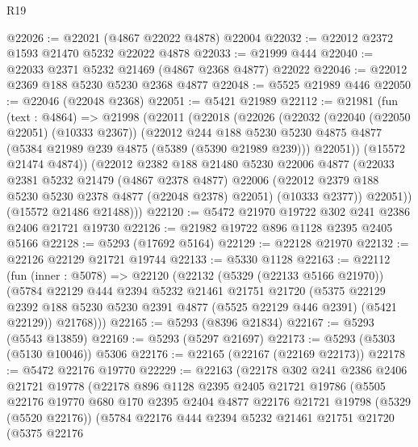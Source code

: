 \begin{lexlean}{R19}
\begin{coremodule}
@22026 := @22021 (@4867 @22022 @4878) @22004
@22032 := @22012 @2372 @1593 @21470 @5232 @22022 @4878
@22033 := @21999 @444
@22040 := @22033 @2371 @5232 @21469 (@4867 @2368 @4877) @22022
@22046 := @22012 @2369 @188 @5230 @5230 @2368 @4877
@22048 := @5525 @21989 @446
@22050 := @22046 (@22048 @2368)
@22051 := @5421 @21989
@22112 := @21981
    (fun (text : @4864) =>
    @21998
      (@22011
        (@22018
          (@22026
            (@22032
              (@22040 (@22050 @22051) (@10333 @2367))
              (@22012
                @244
                @188
                @5230
                @5230
                @4875
                @4877
                (@5384 @21989 @239 @4875 (@5389 (@5390 @21989 @239)))
                @22051))
            (@15572 @21474 @4874))
          (@22012
            @2382
            @188
            @21480
            @5230
            @22006
            @4877
            (@22033
              @2381
              @5232
              @21479
              (@4867 @2378 @4877)
              @22006
              (@22012 @2379 @188 @5230 @5230 @2378 @4877 (@22048 @2378) @22051)
              (@10333 @2377))
            @22051))
        (@15572 @21486 @21488)))
@22120 := @5472 @21970 @19722 @302 @241 @2386 @2406 @21721 @19730
@22126 := @21982 @19722 @896 @1128 @2395 @2405 @5166
@22128 := @5293 (@17692 @5164)
@22129 := @22128 @21970
@22132 := @22126 @22129 @21721 @19744
@22133 := @5330 @1128
@22163 := @22112
    (fun (inner : @5078) =>
    @22120
      (@22132
        (@5329 (@22133 @5166 @21970))
        (@5784
          @22129
          @444
          @2394
          @5232
          @21461
          @21751
          @21720
          (@5375 @22129 @2392 @188 @5230 @5230 @2391 @4877 (@5525 @22129 @446 @2391) (@5421 @22129))
          @21768)))
@22165 := @5293 (@8396 @21834)
@22167 := @5293 (@5543 @13859)
@22169 := @5293 (@5297 @21697)
@22173 := @5293 (@5303 (@5130 @10046)) @5306
@22176 := @22165 (@22167 (@22169 @22173))
@22178 := @5472 @22176 @19770
@22229 := @22163
    (@22178
      @302
      @241
      @2386
      @2406
      @21721
      @19778
      (@22178
        @896
        @1128
        @2395
        @2405
        @21721
        @19786
        (@5505
          @22176
          @19770
          @680
          @170
          @2395
          @2404
          @4877
          @22176
          @21721
          @19798
          (@5329 (@5520 @22176))
          (@5784
            @22176
            @444
            @2394
            @5232
            @21461
            @21751
            @21720
            (@5375
              @22176

\end{coremodule}
\end{lexlean}
